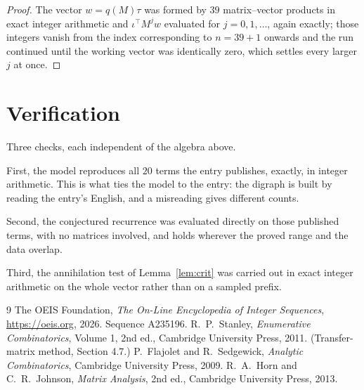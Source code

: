 \documentclass[11pt,a4paper]{article}
\theoremstyle{plain}
\theoremstyle{definition}
\begin{document}
\begin{proof}
The vector $w=q(M)\tau$ was formed by $39$ matrix--vector products in exact integer
arithmetic and $\iota^{\!\top}M^{j}w$ evaluated for $j=0,1,\dots$, again exactly; those
integers vanish from the index corresponding to $n=39+1$ onwards and the run continued
until the working vector was identically zero, which settles every larger $j$ at once.
\end{proof}

\section{Verification}

Three checks, each independent of the algebra above.

First, the model reproduces all $20$ terms the entry publishes, exactly, in integer
arithmetic. This is what ties the model to the entry: the digraph is built by reading the
entry's English, and a misreading gives different counts.

Second, the conjectured recurrence was evaluated directly on those published terms, with no
matrices involved, and holds wherever the proved range and the data overlap.

Third, the annihilation test of Lemma~\ref{lem:crit} was carried out in exact integer
arithmetic on the whole vector rather than on a sampled prefix.

\begin{thebibliography}{9}
 The OEIS Foundation, \emph{The On-Line Encyclopedia of Integer
Sequences}, \url{https://oeis.org}, 2026. Sequence A235196.
 R.~P.~Stanley, \emph{Enumerative Combinatorics}, Volume 1, 2nd ed.,
Cambridge University Press, 2011. (Transfer-matrix method, Section 4.7.)
 P.~Flajolet and R.~Sedgewick, \emph{Analytic Combinatorics}, Cambridge
University Press, 2009.
 R.~A.~Horn and C.~R.~Johnson, \emph{Matrix Analysis}, 2nd ed., Cambridge
University Press, 2013.
\end{thebibliography}
\end{document}

